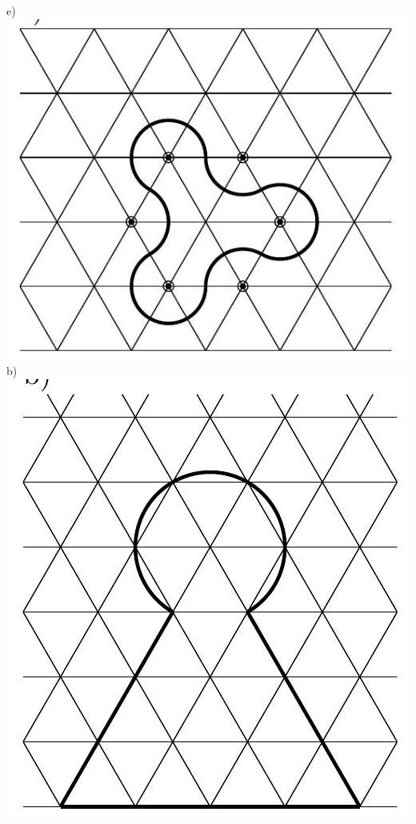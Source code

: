 \documentclass[10pt]{article}
\begin{document}
\begin{enumerate}
e)\\
\includegraphics[max width=\textwidth, center]{2024_11_21_e9b4faa005d5be2cc318g-063(1)}\\
b)\\
\includegraphics[max width=\textwidth, center]{2024_11_21_e9b4faa005d5be2cc318g-063(2)}\\

\end{enumerate}
\end{document}
